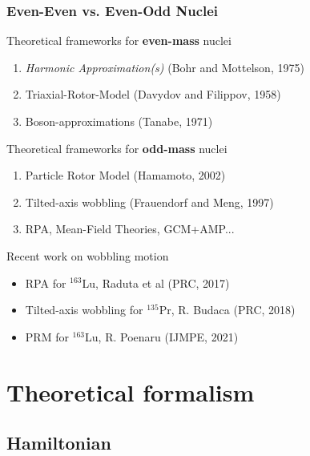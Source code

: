 \documentclass{beamer}
\begin{document}
\begin{frame}
  \frametitle{Even-Even vs. Even-Odd Nuclei}
\begin{block}{Theoretical frameworks for \textbf{even-mass} nuclei}
  \begin{enumerate}
    \item \emph{Harmonic Approximation(s)} (Bohr and Mottelson, 1975)
    \item Triaxial-Rotor-Model (Davydov and Filippov, 1958)
    \item Boson-approximations (Tanabe, 1971)
  \end{enumerate}
\end{block}

\begin{block}{Theoretical frameworks for \textbf{odd-mass} nuclei}
  \begin{enumerate}
    \item Particle Rotor Model (Hamamoto, 2002)
    \item Tilted-axis wobbling (Frauendorf and Meng, 1997)
    \item RPA, Mean-Field Theories, GCM+AMP...
  \end{enumerate}
\end{block}

\begin{exampleblock}{Recent work on wobbling motion}
  \begin{itemize}
    \item RPA for $^{163}$Lu, Raduta et al (PRC, 2017)
    \item Tilted-axis wobbling for $^{135}$Pr, R. Budaca (PRC, 2018)
    \item PRM for $^{163}$Lu, R. Poenaru (IJMPE, 2021)
  \end{itemize}
\end{exampleblock}

\end{frame}

\section{Theoretical formalism}

\subsection{Hamiltonian}
\end{document}
